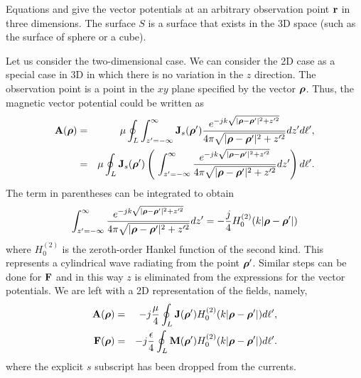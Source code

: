 Equations  and  give the
vector potentials at an arbitrary observation point $\mathbf{r}$ in three
dimensions.  The surface $S$ is a surface that exists in the 3D space
(such as the surface of sphere or a cube).  

Let us consider the two-dimensional case.  We can consider the 2D case
as a special case in 3D in which there is no variation in the $z$
direction.  The observation point is a point in the $xy$ plane
specified by the vector $\boldsymbol{\rho}$.  Thus, the magnetic vector
potential could be written as 
\begin{eqnarray}
\mathbf{A}(\boldsymbol{\rho}) &=& \mu \oint_L\int_{z'=-\infty}^\infty
             \mathbf{J}_s(\boldsymbol{\rho}')
     \frac{e^{-jk\sqrt{|\boldsymbol{\rho}-\boldsymbol{\rho}'|^2+z'^2}}}
          {4\pi\sqrt{|\boldsymbol{\rho}-\boldsymbol{\rho}'|^2+z'^2}}
             dz'd\ell',\\
     &=& \mu \oint_L\mathbf{J}_s(\boldsymbol{\rho}')
     \left(\,\,\int_{z'=-\infty}^\infty
     \frac{e^{-jk\sqrt{|\boldsymbol{\rho}-\boldsymbol{\rho}'|^2+z'^2}}}
          {4\pi\sqrt{|\boldsymbol{\rho}-\boldsymbol{\rho}'|^2+z'^2}}
             dz'\right)d\ell'.
\end{eqnarray}
The term in parentheses can be integrated to obtain
\begin{equation}
\int_{z'=-\infty}^\infty
     \frac{e^{-jk\sqrt{|\boldsymbol{\rho}-\boldsymbol{\rho}'|^2+z'^2}}}
          {4\pi\sqrt{|\boldsymbol{\rho}-\boldsymbol{\rho}'|^2+z'^2}}
             dz' = -\frac{j}{4}H_0^{(2)}(k|\boldsymbol{\rho}-\boldsymbol{\rho}'|)
\end{equation}
where $H_0^{(2)}$ is the zeroth-order Hankel function of the second
kind.  This represents a cylindrical wave radiating from the point
$\boldsymbol{\rho}'$.  Similar steps can be done for $\mathbf{F}$ and in this way $z$
is eliminated from the expressions for the vector potentials.  We are
left with a 2D representation of the fields, namely,
\begin{eqnarray}
\mathbf{A}(\boldsymbol{\rho}) &=& -j\frac{\mu}{4} \oint_L \mathbf{J}(\boldsymbol{\rho}')
             H_0^{(2)}(k|\boldsymbol{\rho}-\boldsymbol{\rho}'|)
             d\ell',  \label{eq:aVecTwoD} \\
\mathbf{F}(\boldsymbol{\rho}) &=&-j\frac{\epsilon}{4} \oint_L \mathbf{M}(\boldsymbol{\rho}')
             H_0^{(2)}(k|\boldsymbol{\rho}-\boldsymbol{\rho}'|)
             d\ell'. \label{eq:fVecTwoD} 
\end{eqnarray}
where the explicit $s$ subscript has been dropped from the currents.

